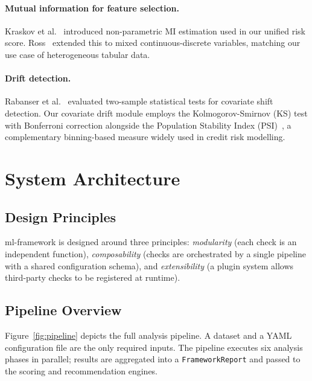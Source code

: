 \documentclass[11pt]{article}
\begin{document}
\paragraph{Mutual information for feature selection.}
Kraskov et al.~\cite{kraskov2004estimating} introduced non-parametric MI
estimation used in our unified risk score.  Ross~\cite{ross2014mutual}
extended this to mixed continuous-discrete variables, matching our use case
of heterogeneous tabular data.

\paragraph{Drift detection.}
Rabanser et al.~\cite{rabanser2019failing} evaluated two-sample statistical
tests for covariate shift detection.  Our covariate drift module employs the
Kolmogorov-Smirnov (KS) test with Bonferroni correction alongside the
Population Stability Index (PSI)~\cite{siddiqi2006credit}, a complementary
binning-based measure widely used in credit risk modelling.

\section{System Architecture}
\label{sec:architecture}

\subsection{Design Principles}

ml-framework is designed around three principles: \emph{modularity} (each
check is an independent function), \emph{composability} (checks are
orchestrated by a single pipeline with a shared configuration schema), and
\emph{extensibility} (a plugin system allows third-party checks to be
registered at runtime).

\subsection{Pipeline Overview}

Figure~\ref{fig:pipeline} depicts the full analysis pipeline.  A dataset and
a YAML configuration file are the only required inputs.  The pipeline executes
six analysis phases in parallel; results are aggregated into a
\texttt{FrameworkReport} and passed to the scoring and recommendation engines.
\end{document}
